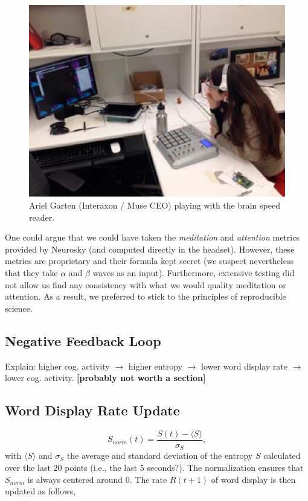 \begin{figure}[!t]
\centering
\includegraphics[width=0.9\columnwidth]{../figures/ariel.eps}
\caption{Ariel Garten (Interaxon / Muse CEO) playing with the brain speed reader.}
\label{fig:ariel}
\end{figure}

One could argue that we could have taken the {\it meditation} and {\it attention} metrics provided by Neurosky (and computed directly in the headset). However, these metrics are proprietary and their formula kept secret (we suspect nevertheless that they take $\alpha$ and $\beta$ waves  as an input). Furthermore, extensive testing did not allow us find any consistency with what we would quality meditation or attention. As a result, we preferred to stick to the principles of reproducible science.

\subsection{Negative Feedback Loop}

Explain: higher cog. activity  $\rightarrow$  higher entropy $\rightarrow$  lower word display rate $\rightarrow$ lower cog. activity. {\bf [probably not worth a section]}


\subsection{Word Display Rate Update}

\begin{equation}
\label{eq:Snormalized}
S_{norm}(t) = \frac{S(t) - \langle S \rangle}{\sigma_{S}}, 
\end{equation}
with $\langle S \rangle$ and $\sigma_{S}$ the average and standard deviation of the entropy $S$ calculated over the last 20 points (i.e., the last 5 seconds?). The normalization ensures that $S_{norm}$ is always centered around $0$. The rate $R(t+1)$ of word display is then updated as follows,

